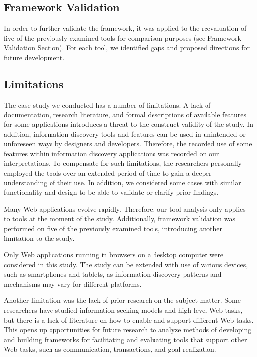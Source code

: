 \documentclass{sigchi}
\begin{document}
{\subsection{Framework Validation}
\label{subsection:validating}
In order to further validate the framework, it was applied to the reevaluation of five of the previously examined tools for comparison purposes (see Framework Validation Section). For each tool, we identified gaps and proposed directions for future development. 
}%

{\subsection{Limitations}
The case study we conducted has a number of limitations. A lack of documentation, research literature, and formal descriptions of available features for some applications introduces a threat to the construct validity of the study. In addition, information discovery tools and features can be used in unintended or unforeseen ways by designers and developers. Therefore, the recorded use of some features within information discovery applications was recorded on our interpretations. To compensate for such limitations, the researchers personally employed the tools over an extended period of time to gain a deeper understanding of their use. In addition, we considered some cases with similar functionality and design to be able to validate or clarify prior findings. 

Many Web applications evolve rapidly. Therefore, our tool analysis only applies to tools at the moment of the study. Additionally, framework validation was performed on five of the previously examined tools, introducing another limitation to the study. 

Only Web applications running in browsers on a desktop computer were considered in this study. The study can be extended with use of various devices, such as smartphones and tablets, as information discovery patterns and mechanisms may vary for different platforms. 

Another limitation was the lack of prior research on the subject matter. Some researchers have studied information seeking models and high-level Web tasks, but there is a lack of literature on how to enable and support different Web tasks. This opens up opportunities for future research to analyze methods of developing and building frameworks for facilitating and evaluating tools that support other Web tasks, such as communication, transactions, and goal realization.
}
\end{document}
